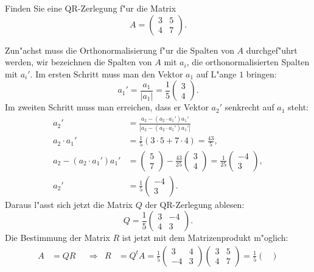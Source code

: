 Finden Sie eine QR-Zerlegung f"ur die Matrix
\[
A=\begin{pmatrix}
3&5\\
4&7
\end{pmatrix}.
\]

\begin{loesung}
Zun"achst muss die Orthonormalisierung f"ur die Spalten von $A$
durchgef"uhrt werden, wir bezeichnen die Spalten von $A$ mit $a_i$,
die orthonormalisierten Spalten mit $a_i'$. Im ersten Schritt muss man
den Vektor $a_1$ auf L"ange $1$ bringen:
\[
a_1'=\frac{a_1}{|a_1|}=\frac15\begin{pmatrix}3\\4\end{pmatrix}.
\]
Im zweiten Schritt muss man erreichen, dass er Vektor $a_2'$ senkrecht
auf $a_1$ steht:
\begin{align*}
a_2'&=\frac{a_2-(a_2\cdot a_1')a_1'}{|a_2-(a_2\cdot a_1')a_1'|}\\
a_2\cdot a_1'&=\frac15(3\cdot 5+7\cdot 4)=\frac{43}{5},\\
a_2-(a_2\cdot a_1')a_1'&=
\begin{pmatrix}5\\7\end{pmatrix}
-\frac{43}{25}\begin{pmatrix}3\\4\end{pmatrix}
=\frac{1}{25}\begin{pmatrix}-4\\3\end{pmatrix},
\\
a_2'&=\frac15\begin{pmatrix}-4\\3\end{pmatrix}.
\end{align*}
Daraus l"asst sich jetzt die Matrix $Q$ der QR-Zerlegung ablesen:
\[
Q=\frac15
\begin{pmatrix}
3&-4\\
4& 3
\end{pmatrix}.
\]
Die Bestimmung der Matrix $R$ ist jetzt mit dem Matrizenprodukt m"oglich:
\begin{align*}
A&=QR&&\Rightarrow&R&=Q^tA=\frac15\begin{pmatrix}3&4\\-4&3\end{pmatrix}
\begin{pmatrix}3&5\\4&7\end{pmatrix}
=\frac15\begin{pmatrix}

\end{pmatrix}
\end{align*}
\end{loesung}
